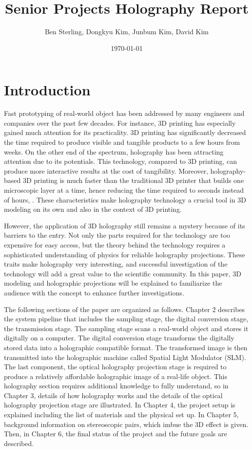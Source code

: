 \documentclass[12pt]{article}
\title{Senior Projects Holography Report}
\date{\today}
\author{Ben Sterling, Dongkyu Kim, Junbum Kim, David Kim}
\begin{document}
\maketitle
\clearpage

\section{Introduction}
\qquad
Fast prototyping of real-world object has been addressed by many engineers and companies over the past few decades. For instance, 3D printing has especially gained much attention for its practicality. 3D printing has significantly decreased the time required to produce visible and tangible products to a few hours from weeks. On the other end of the spectrum, holography has been attracting attention due to its potentials. This technology, compared to 3D printing, can produce more interactive results at the cost of tangibility. Moreover, holography-based 3D printing is much faster than the traditional 3D printer that builds one microscopic layer at a time, hence reducing the time required to seconds instead of hours,  \cite{Shusteffeaao5496}. These characteristics make holography technology a crucial tool in 3D modeling on its own and also in the context of 3D printing.

However, the application of 3D holography still remains a mystery because of its barriers to the entry. Not only the parts required for the technology are too expensive for easy access, but the theory behind the technology requires a sophisticated understanding of physics for reliable holography projections. These traits make holography very interesting, and successful investigation of the technology will add a great value to the scientific community. In this paper, 3D modeling and holographic projections will be explained to familiarize the audience with the concept to enhance further investigations.

\par
The following sections of the paper are organized as follows. Chapter 2 describes the system pipeline that includes the sampling stage, the digital conversion stage, the transmission stage. The sampling stage scans a real-world object and stores it digitally on a computer. The digital conversion stage transforms the digitally stored data into a holographic compatible format. The transformed image is then transmitted into the holographic machine called Spatial Light Modulator (SLM). The last component, the optical holography projection stage is required to produce a relatively affordable holographic image of a real-life object. This holography section requires additional knowledge to fully understand, so in Chapter 3, details of how holography works and the details of the optical holography projection stage are illustrated. In Chapter 4, the project setup is explained including the list of materials and the physical set up. In Chapter 5, background information on stereoscopic pairs, which imbue the 3D effect is given. Then, in Chapter 6, the final status of the project and the future goals are described.
\end{document}
